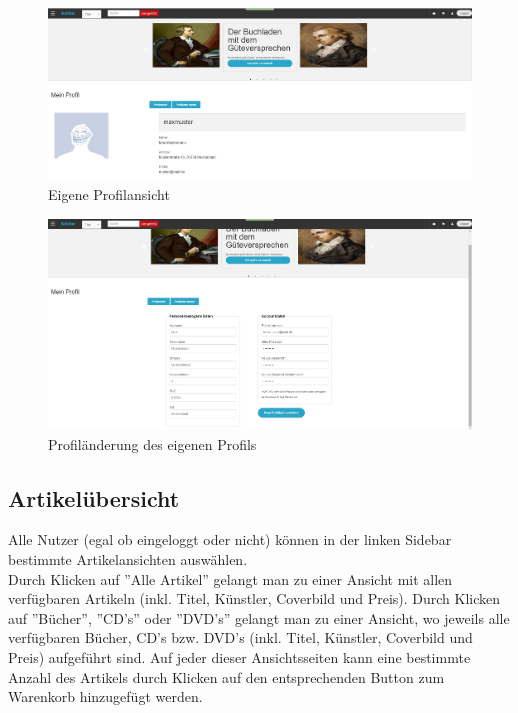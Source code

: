 \documentclass[a4paper]{article}
\begin{document}
\begin{figure}[ht]
\centering
\includegraphics[width=1.0\textwidth]{Profil.jpg}
\caption{Eigene Profilansicht}
\end{figure}
\smallskip

\begin{figure}[ht]
\centering
\includegraphics[width=1.0\textwidth]{Profilaenderung.jpg}
\caption{Profiländerung des eigenen Profils}
\end{figure}
\smallskip

\FloatBarrier

\subsection{Artikelübersicht} \label{ansicht} 

Alle Nutzer (egal ob eingeloggt oder nicht) können in der linken Sidebar bestimmte Artikelansichten auswählen. \\
Durch Klicken auf ''Alle Artikel'' gelangt man zu einer Ansicht mit allen verfügbaren Artikeln (inkl. Titel, Künstler, Coverbild und Preis). Durch Klicken auf ''Bücher'', ''CD's'' oder ''DVD's'' gelangt man zu einer Ansicht, wo jeweils alle verfügbaren Bücher, CD's bzw. DVD's (inkl. Titel, Künstler, Coverbild und Preis) aufgeführt sind. Auf jeder dieser Ansichtsseiten kann eine bestimmte Anzahl des Artikels durch Klicken auf den entsprechenden Button zum Warenkorb hinzugefügt werden.
\end{document}
